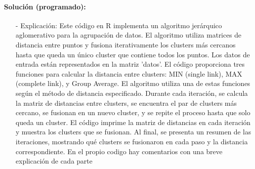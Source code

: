 \documentclass[a4paper, 12pt]{article}
\begin{document}
	\paragraph{Solución (programado):}
	
	\begin{itemize}
	  \item[-] Explicación:
	Este código en R implementa un algoritmo jerárquico aglomerativo para la agrupación de datos. El algoritmo utiliza matrices de distancia entre puntos y fusiona iterativamente los clusters más cercanos hasta que queda un único cluster que contiene todos los puntos. Los datos de entrada están representados en la matriz 'datos'. El código proporciona tres funciones para calcular la distancia entre clusters: MIN (single link), MAX (complete link), y Group Average. El algoritmo utiliza una de estas funciones según el método de distancia especificado. Durante cada iteración, se calcula la matriz de distancias entre clusters, se encuentra el par de clusters más cercano, se fusionan en un nuevo cluster, y se repite el proceso hasta que solo queda un cluster. El código imprime la matriz de distancias en cada iteración y muestra los clusters que se fusionan. Al final, se presenta un resumen de las iteraciones, mostrando qué clusters se fusionaron en cada paso y la distancia correspondiente.
	En el propio codigo hay comentarios con una breve explicación de cada parte
	\end{itemize}
\end{document}

